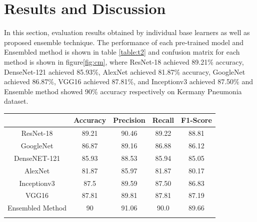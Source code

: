 \documentclass{ieeeaccess}
\begin{document}
\section{Results and Discussion}
In this section, evaluation results obtained by individual base learners as well as proposed ensemble technique. The performance of each pre-trained model and Ensembled method is shown in table \ref{table:t2} and confusion matrix for each method is shown in figure\ref{fig:cm}, where ResNet-18 achieved 89.21\% accuracy, DenseNet-121 achieved 85.93\%, AlexNet achieved 81.87\% accuracy, GoogleNet achieved 86.87\%, VGG16 achieved 87.81\%, and Inceptionv3 achieved 87.50\% and Ensemble method showed 90\% accuracy respectively on Kermany Pneumonia dataset. 
\begin{center}
\begin{tabular}{ |c|c|c|c|c| } 
 \hline
 \rowcolor{lightgray} 
 {Classifier & Accuracy & Precision & Recall & F1-Score} \\ 
 \hline
 ResNet-18 & 89.21 & 90.46 & 89.22 & 88.81 \\ 
 \hline 
 GoogleNet & 86.87 & 89.16 & 86.88 & 86.12  \\ 
 \hline
 DenseNET-121 & 85.93 & 88.53 & 85.94 & 85.05 \\ 
 \hline
 AlexNet & 81.87 & 85.97 & 81.87 & 80.17 \\ 
 \hline
 Inceptionv3 & 87.5 & 89.59 & 87.50 & 86.83 \\ 
 \hline
 VGG16 & 87.81 & 89.81 & 87.81 & 87.19 \\ 
 \hline
 Ensembled Method & 90 & 91.06 & 90.0 & 89.66 \\ 
 \hline
\label{table:t2}
\end{tabular}
\end{center}
\end{document}
